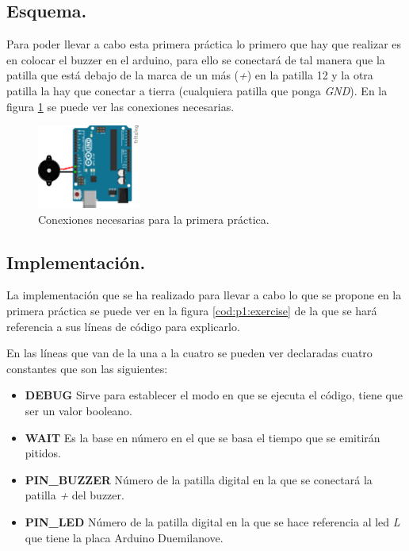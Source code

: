 \documentclass{article}
\begin{document}
\subsection{Esquema.}

	Para poder llevar a cabo esta primera práctica lo primero que hay que realizar es en colocar el buzzer en el arduino, para ello se conectará de tal manera que la patilla que está debajo de la marca de un más (\emph{+}) en la patilla 12 y la otra patilla la hay que conectar a tierra (cualquiera patilla que ponga \emph{GND}). En la figura \ref{fig:p1:schema} se puede ver las conexiones necesarias.

\begin{figure}[h]
  \centering
    \includegraphics[width=0.3\textwidth]{img/p1_schema.png}
  \caption{Conexiones necesarias para la primera práctica.}
  \label{fig:p1:schema}
\end{figure}

\subsection{Implementación.}

	La implementación que se ha realizado para llevar a cabo lo que se propone en la primera práctica se puede ver en la figura \ref{cod:p1:exercise} de la que se hará referencia a sus líneas de código para explicarlo.
	
	En las líneas que van de la una a la cuatro se pueden ver declaradas cuatro constantes que son las siguientes:
\begin{itemize}
	\item \textbf{DEBUG} Sirve para establecer el modo en que se ejecuta el código, tiene que ser un valor booleano.
	\item \textbf{WAIT} Es la base en número en el que se basa el tiempo que se emitirán pitidos.
	\item \textbf{PIN\_BUZZER} Número de la patilla digital en la que se conectará la patilla \emph{+} del buzzer.
	\item \textbf{PIN\_LED} Número de la patilla digital en la que se hace referencia al led \emph{L} que tiene la placa Arduino Duemilanove.
\end{itemize}
\end{document}
